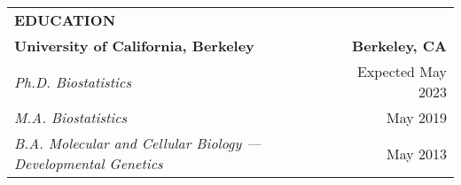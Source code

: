 \begin{center}
    \begin{tabularx}{\textwidth}{L R}
        {\large \textbf{EDUCATION}} & \\
        \textbf{University of California, Berkeley} & \textbf{Berkeley, CA} \\
        \small \textit{Ph.D. Biostatistics} & \small Expected May 2023 \\
        \small \textit{M.A. Biostatistics} & \small May 2019 \\
        \small \textit{B.A. Molecular and Cellular Biology --- Developmental Genetics} & \small May 2013 \\
    \end{tabularx}
\end{center}
